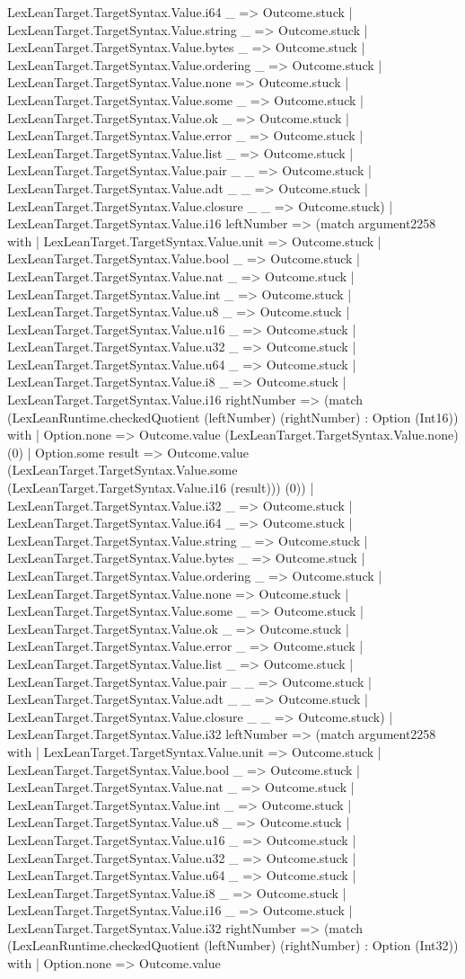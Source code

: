 \documentclass[11pt]{article}
\begin{document}
LexLeanTarget.TargetSyntax.Value.i64 \_ => Outcome.stuck | LexLeanTarget.TargetSyntax.Value.string \_ => Outcome.stuck | LexLeanTarget.TargetSyntax.Value.bytes \_ => Outcome.stuck | LexLeanTarget.TargetSyntax.Value.ordering \_ => Outcome.stuck | LexLeanTarget.TargetSyntax.Value.none => Outcome.stuck | LexLeanTarget.TargetSyntax.Value.some \_ => Outcome.stuck | LexLeanTarget.TargetSyntax.Value.ok \_ => Outcome.stuck | LexLeanTarget.TargetSyntax.Value.error \_ => Outcome.stuck | LexLeanTarget.TargetSyntax.Value.list \_ => Outcome.stuck | LexLeanTarget.TargetSyntax.Value.pair \_ \_ => Outcome.stuck | LexLeanTarget.TargetSyntax.Value.adt \_ \_ => Outcome.stuck | LexLeanTarget.TargetSyntax.Value.closure \_ \_ => Outcome.stuck) | LexLeanTarget.TargetSyntax.Value.i16 leftNumber => (match argument2258 with | LexLeanTarget.TargetSyntax.Value.unit => Outcome.stuck | LexLeanTarget.TargetSyntax.Value.bool \_ => Outcome.stuck | LexLeanTarget.TargetSyntax.Value.nat \_ => Outcome.stuck | LexLeanTarget.TargetSyntax.Value.int \_ => Outcome.stuck | LexLeanTarget.TargetSyntax.Value.u8 \_ => Outcome.stuck | LexLeanTarget.TargetSyntax.Value.u16 \_ => Outcome.stuck | LexLeanTarget.TargetSyntax.Value.u32 \_ => Outcome.stuck | LexLeanTarget.TargetSyntax.Value.u64 \_ => Outcome.stuck | LexLeanTarget.TargetSyntax.Value.i8 \_ => Outcome.stuck | LexLeanTarget.TargetSyntax.Value.i16 rightNumber => (match (LexLeanRuntime.checkedQuotient (leftNumber) (rightNumber) : Option (Int16)) with | Option.none => Outcome.value (LexLeanTarget.TargetSyntax.Value.none) (0) | Option.some result => Outcome.value (LexLeanTarget.TargetSyntax.Value.some (LexLeanTarget.TargetSyntax.Value.i16 (result))) (0)) | LexLeanTarget.TargetSyntax.Value.i32 \_ => Outcome.stuck | LexLeanTarget.TargetSyntax.Value.i64 \_ => Outcome.stuck | LexLeanTarget.TargetSyntax.Value.string \_ => Outcome.stuck | LexLeanTarget.TargetSyntax.Value.bytes \_ => Outcome.stuck | LexLeanTarget.TargetSyntax.Value.ordering \_ => Outcome.stuck | LexLeanTarget.TargetSyntax.Value.none => Outcome.stuck | LexLeanTarget.TargetSyntax.Value.some \_ => Outcome.stuck | LexLeanTarget.TargetSyntax.Value.ok \_ => Outcome.stuck | LexLeanTarget.TargetSyntax.Value.error \_ => Outcome.stuck | LexLeanTarget.TargetSyntax.Value.list \_ => Outcome.stuck | LexLeanTarget.TargetSyntax.Value.pair \_ \_ => Outcome.stuck | LexLeanTarget.TargetSyntax.Value.adt \_ \_ => Outcome.stuck | LexLeanTarget.TargetSyntax.Value.closure \_ \_ => Outcome.stuck) | LexLeanTarget.TargetSyntax.Value.i32 leftNumber => (match argument2258 with | LexLeanTarget.TargetSyntax.Value.unit => Outcome.stuck | LexLeanTarget.TargetSyntax.Value.bool \_ => Outcome.stuck | LexLeanTarget.TargetSyntax.Value.nat \_ => Outcome.stuck | LexLeanTarget.TargetSyntax.Value.int \_ => Outcome.stuck | LexLeanTarget.TargetSyntax.Value.u8 \_ => Outcome.stuck | LexLeanTarget.TargetSyntax.Value.u16 \_ => Outcome.stuck | LexLeanTarget.TargetSyntax.Value.u32 \_ => Outcome.stuck | LexLeanTarget.TargetSyntax.Value.u64 \_ => Outcome.stuck | LexLeanTarget.TargetSyntax.Value.i8 \_ => Outcome.stuck | LexLeanTarget.TargetSyntax.Value.i16 \_ => Outcome.stuck | LexLeanTarget.TargetSyntax.Value.i32 rightNumber => (match (LexLeanRuntime.checkedQuotient (leftNumber) (rightNumber) : Option (Int32)) with | Option.none => Outcome.value 
\end{document}
